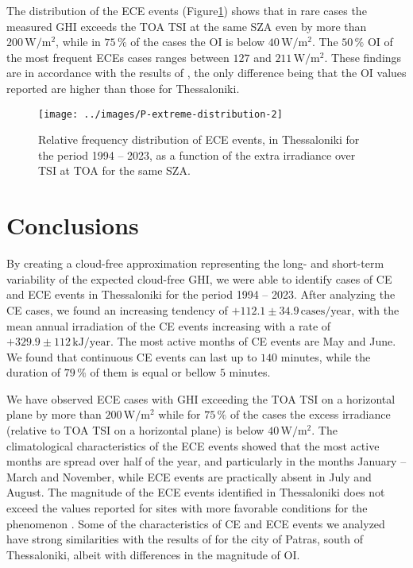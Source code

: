 \documentclass[preprint, 5p,
authoryear]{elsarticle} %
\providecommand{\DIFaddtex}[1]{{\protect\color{blue}\uwave{#1}}} %
\providecommand{\DIFdeltex}[1]{{\protect\color{red}\sout{#1}}}                      %
\providecommand{\DIFaddbegin}{} %
\providecommand{\DIFaddend}{} %
\providecommand{\DIFdelbegin}{} %
\providecommand{\DIFdelend}{} %
\providecommand{\DIFadd}[1]{\texorpdfstring{\DIFaddtex{#1}}{#1}} %
\providecommand{\DIFdel}[1]{\texorpdfstring{\DIFdeltex{#1}}{}} %
\newcommand{\DIFscaledelfig}{0.5}
\newlength{\DIFdelgraphicswidth} %
\newlength{\DIFdelgraphicsheight} %
\newcommand{\DIFaddincludegraphics}[2][]{{\color{blue}\fbox{\DIFOincludegraphics[#1]{#2}}}} %
\newcommand{\DIFdelincludegraphics}[2][]{%
\sbox{\DIFdelgraphicsbox}{\DIFOincludegraphics[#1]{#2}}%
\settoboxwidth{\DIFdelgraphicswidth}{\DIFdelgraphicsbox} %
\settoboxtotalheight{\DIFdelgraphicsheight}{\DIFdelgraphicsbox} %
\scalebox{\DIFscaledelfig}{%
\parbox[b]{\DIFdelgraphicswidth}{\usebox{\DIFdelgraphicsbox}\\[-\baselineskip] \rule{\DIFdelgraphicswidth}{0em}}\llap{\resizebox{\DIFdelgraphicswidth}{\DIFdelgraphicsheight}{%
\setlength{\unitlength}{\DIFdelgraphicswidth}%
\begin{picture}(1,1)%
\thicklines\linethickness{2pt} %
{\color[rgb]{1,0,0}\put(0,0){\framebox(1,1){}}}%
{\color[rgb]{1,0,0}\put(0,0){\line( 1,1){1}}}%
{\color[rgb]{1,0,0}\put(0,1){\line(1,-1){1}}}%
\end{picture}%
}\hspace*{3pt}}} %
} %
\DeclareRobustCommand{\DIFaddbegin}{\DIFOaddbegin \let\includegraphics\DIFaddincludegraphics} %
\DeclareRobustCommand{\DIFaddend}{\DIFOaddend \let\includegraphics\DIFOincludegraphics} %
\DeclareRobustCommand{\DIFdelbegin}{\DIFOdelbegin \let\includegraphics\DIFdelincludegraphics} %
\DeclareRobustCommand{\DIFdelend}{\DIFOaddend \let\includegraphics\DIFOincludegraphics} %
\begin{document}
The distribution of the ECE events
(Figure\nobreakspace{}\ref{fig:P-extreme-distribution}) shows that in
rare cases the measured GHI exceeds the TOA TSI at the same SZA even by
more than \(200\,\text{W}/\text{m}^2\), while in \(75\,\%\) of the cases
the OI is below \(40\,\text{W}/\text{m}^2\). The \(50\,\%\) OI of the
most frequent ECEs cases ranges between \(127\) and
\(211\,\text{W}/\text{m}^2\). These findings are in accordance with the
results of \citet{Vamvakas2020}, the only difference being that the OI
values reported are higher than those for Thessaloniki.

\begin{figure}

{\centering \texttt{[image: ../images/P-extreme-distribution-2]} 

}

\caption{Relative frequency distribution of ECE events, in Thessaloniki for the period 1994 -- 2023, as a function of the extra irradiance over TSI at TOA for the same SZA.}\label{fig:P-extreme-distribution}
\end{figure}

\hypertarget{conclusions}{%
\section{Conclusions}\label{conclusions}}

By creating a cloud-free approximation representing the long- and
short-term variability of the expected cloud-free GHI, we were able to
identify cases of CE and ECE events in Thessaloniki for the period 1994
-- 2023. After analyzing the CE cases, we found an increasing tendency
of \(+112.1\pm 34.9\,\text{cases}/\text{year}\), with the mean annual
irradiation of the CE events increasing with a rate of
\DIFdelbegin \DIFdel{\(+329.9\pm 112\,\text{kJ}/\text{year}\)}\DIFdelend \DIFaddbegin \DIFadd{\(+329.9\pm 112.0\,\text{kJ}/\text{year}\)}\DIFaddend . The most active months of CE
events are May and June. We found that continuous CE events can last up
to \(140\) minutes, while the duration of \(79\,\%\) of them is equal or
bellow \(5\) minutes.

We have observed ECE cases with GHI exceeding the TOA TSI on a
horizontal plane by more than \(200\,\text{W}/\text{m}^{2}\) while for
\(75\,\%\) of the cases the excess irradiance (relative to TOA TSI on a
horizontal plane) is below \(40\,\text{W}/\text{m}^{2}\). The
climatological characteristics of the ECE events showed that the most
active months are spread over half of the year, and particularly in the
months January -- March and November, while ECE events are practically
absent in July and August. The magnitude of the ECE events identified in
Thessaloniki does not exceed the values reported for sites with more
favorable conditions for the phenomenon \citep[e.g.,][]{Cordero2023}.
Some of the characteristics of CE and ECE events we analyzed have strong
similarities with the results of \citet{Vamvakas2020} for the city of
Patras, south of Thessaloniki, albeit with differences in the magnitude
of OI.
\end{document}
